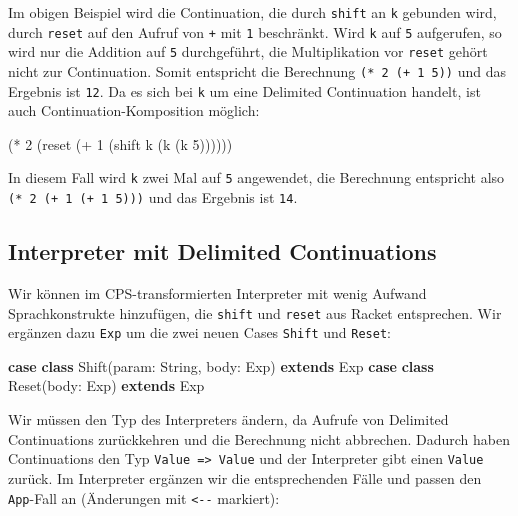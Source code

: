 \documentclass[]{article}
\newenvironment{Shaded}{}{}
\newcommand{\DecValTok}[1]{\textcolor[rgb]{0.25,0.63,0.44}{#1}}
\newcommand{\FunctionTok}[1]{\textcolor[rgb]{0.02,0.16,0.49}{#1}}
\newcommand{\KeywordTok}[1]{\textcolor[rgb]{0.00,0.44,0.13}{\textbf{#1}}}
\newcommand{\NormalTok}[1]{#1}
\newcommand{\OperatorTok}[1]{\textcolor[rgb]{0.40,0.40,0.40}{#1}}
\begin{document}
Im obigen Beispiel wird die Continuation, die durch \texttt{shift} an
\texttt{k} gebunden wird, durch \texttt{reset} auf den Aufruf von
\texttt{+} mit \texttt{1} beschränkt. Wird \texttt{k} auf \texttt{5}
aufgerufen, so wird nur die Addition auf \texttt{5} durchgeführt, die
Multiplikation vor \texttt{reset} gehört nicht zur Continuation. Somit
entspricht die Berechnung \texttt{(*\ 2\ (+\ 1\ 5))} und das Ergebnis
ist \texttt{12}. Da es sich bei \texttt{k} um eine Delimited
Continuation handelt, ist auch Continuation-Komposition möglich:

\begin{Shaded}
\begin{Highlighting}[]
\NormalTok{(}\OperatorTok{*} \DecValTok{2}\NormalTok{ (reset (}\OperatorTok{+} \DecValTok{1}\NormalTok{ (shift k (k (k }\DecValTok{5}\NormalTok{))))))}
\end{Highlighting}
\end{Shaded}

In diesem Fall wird \texttt{k} zwei Mal auf \texttt{5} angewendet, die
Berechnung entspricht also \texttt{(*\ 2\ (+\ 1\ (+\ 1\ 5)))} und das
Ergebnis ist \texttt{14}.

\hypertarget{interpreter-mit-delimited-continuations}{%
\subsection{Interpreter mit Delimited
Continuations}\label{interpreter-mit-delimited-continuations}}

Wir können im CPS-transformierten Interpreter mit wenig Aufwand
Sprachkonstrukte hinzufügen, die \texttt{shift} und \texttt{reset} aus
Racket entsprechen. Wir ergänzen dazu \texttt{Exp} um die zwei neuen
Cases \texttt{Shift} und \texttt{Reset}:

\begin{Shaded}
\begin{Highlighting}[]
\KeywordTok{case} \KeywordTok{class} \FunctionTok{Shift}\NormalTok{(param: String, body: Exp) }\KeywordTok{extends}\NormalTok{ Exp}
\KeywordTok{case} \KeywordTok{class} \FunctionTok{Reset}\NormalTok{(body: Exp) }\KeywordTok{extends}\NormalTok{ Exp}
\end{Highlighting}
\end{Shaded}

Wir müssen den Typ des Interpreters ändern, da Aufrufe von Delimited
Continuations zurückkehren und die Berechnung nicht abbrechen. Dadurch
haben Continuations den Typ \texttt{Value\ =\textgreater{}\ Value} und
der Interpreter gibt einen \texttt{Value} zurück. Im Interpreter
ergänzen wir die entsprechenden Fälle und passen den \texttt{App}-Fall
an (Änderungen mit \texttt{\textless{}-\/-} markiert):
\end{document}
